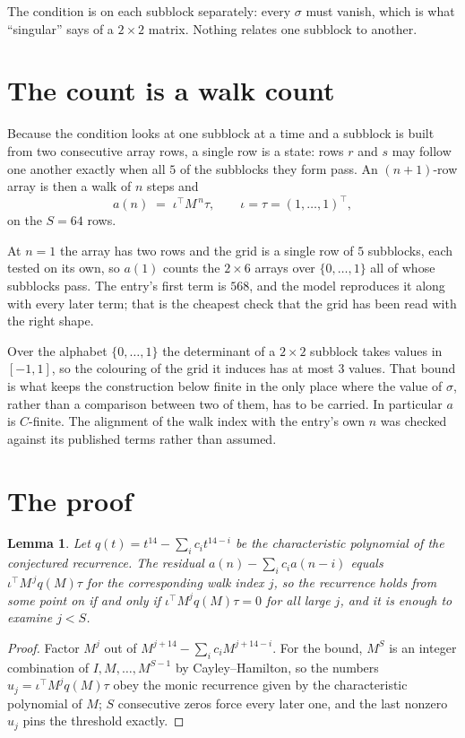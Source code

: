 \documentclass[11pt,a4paper]{article}
\theoremstyle{plain}
\newtheorem{lemma}[theorem]{Lemma}
\theoremstyle{definition}
\begin{document}
The condition is on each subblock separately: every $\sigma$ must vanish, which is what
``singular'' says of a $2\times2$ matrix. Nothing
relates one subblock to another.

\section{The count is a walk count}

Because the condition looks at one subblock at a time and a subblock is
built from two consecutive array rows, a single row is a state: rows $r$ and $s$ may follow one
another exactly when all $5$ of the subblocks they form pass. An $(n+1)$-row array is then a
walk of $n$ steps and
\[
a(n)\;=\;\iota^{\!\top}M^{\,n}\tau,\qquad\iota=\tau=(1,\dots,1)^{\!\top},
\]
on the $S=64$ rows.

At $n=1$ the array has two rows and the grid is a single row of $5$
subblocks, each tested on its own, so $a(1)$ counts the
$2\times6$ arrays over $\{0,\dots,1\}$ all of whose subblocks pass. The entry's
first term is $568$, and the model reproduces it along with every later term; that is the
cheapest check that the grid has been read with the right shape.

Over the alphabet $\{0,\dots,1\}$ the determinant of a $2\times2$ subblock takes values in
$[-1,1]$, so the colouring of the grid it induces has at most $3$ values.
That bound is what keeps the construction below finite in the only place where the value of
$\sigma$, rather than a comparison between two of them, has to be carried.
In particular $a$ is $C$-finite. The alignment of the walk index with the entry's own $n$ was
checked against its published terms rather than assumed.

\section{The proof}

\begin{lemma}\label{lem:crit}
Let $q(t)=t^{14}-\sum_i c_it^{14-i}$ be the characteristic polynomial of the
conjectured recurrence. The residual $a(n)-\sum_ic_ia(n-i)$ equals
$\iota^{\!\top}M^{\,j}q(M)\tau$ for the corresponding walk index $j$, so the recurrence
holds from some point on if and only if $\iota^{\!\top}M^{j}q(M)\tau=0$ for all large $j$,
and it is enough to examine $j<S$.
\end{lemma}

\begin{proof}
Factor $M^{j}$ out of $M^{j+14}-\sum_ic_iM^{j+14-i}$. For the bound, $M^{S}$
is an integer combination of $I,M,\dots,M^{S-1}$ by Cayley--Hamilton, so the numbers
$u_j=\iota^{\!\top}M^{j}q(M)\tau$ obey the monic recurrence given by the characteristic
polynomial of $M$; $S$ consecutive zeros force every later one, and the last nonzero $u_j$
pins the threshold exactly.
\end{proof}
\end{document}
